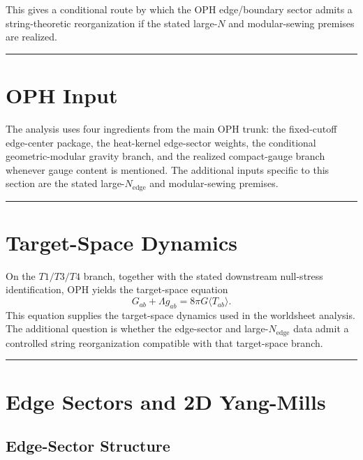 This gives a conditional route by which the OPH edge/boundary sector admits a string-theoretic reorganization if the stated large-\(N\) and modular-sewing premises are realized.

\begin{center}\rule{0.5\linewidth}{0.5pt}\end{center}

\section{OPH Input}\label{2-oph-inputs-used}

The analysis uses four ingredients from the main OPH trunk: the fixed-cutoff edge-center package, the heat-kernel edge-sector weights, the conditional geometric-modular gravity branch, and the realized compact-gauge branch whenever gauge content is mentioned. The additional inputs specific to this section are the stated large-\(N_{\mathrm{edge}}\) and modular-sewing premises.

\begin{center}\rule{0.5\linewidth}{0.5pt}\end{center}

\section{Target-Space Dynamics}\label{3-einstein-equation-from-entanglement-equilibrium}

On the \(T1/T3/T4\) branch, together with the stated downstream null-stress identification, OPH yields the target-space equation
\[
\boxed{G_{ab} + \Lambda g_{ab} = 8\pi G \langle T_{ab} \rangle}.
\]
This equation supplies the target-space dynamics used in the worldsheet analysis. The additional question is whether the edge-sector and large-\(N_{\mathrm{edge}}\) data admit a controlled string reorganization compatible with that target-space branch.

\begin{center}\rule{0.5\linewidth}{0.5pt}\end{center}

\section{Edge Sectors and 2D Yang-Mills}\label{4-edge-sectors-and-2d-yang-mills}

\subsection{Edge-Sector Structure}\label{41-edge-sector-structure}

